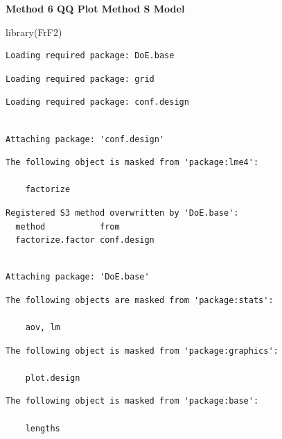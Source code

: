 \documentclass[
  letterpaper,
  DIV=11,
  numbers=noendperiod]{scrartcl}
\newenvironment{Shaded}{\begin{snugshade}}{\end{snugshade}}
\newcommand{\FunctionTok}[1]{\textcolor[rgb]{0.28,0.35,0.67}{#1}}
\newcommand{\NormalTok}[1]{\textcolor[rgb]{0.00,0.23,0.31}{#1}}
\begin{document}
\textbf{Method 6 QQ Plot Method S Model}

\begin{Shaded}
\begin{Highlighting}[]
\FunctionTok{library}\NormalTok{(FrF2)}
\end{Highlighting}
\end{Shaded}

\begin{verbatim}
Loading required package: DoE.base
\end{verbatim}

\begin{verbatim}
Loading required package: grid
\end{verbatim}

\begin{verbatim}
Loading required package: conf.design
\end{verbatim}

\begin{verbatim}

Attaching package: 'conf.design'
\end{verbatim}

\begin{verbatim}
The following object is masked from 'package:lme4':

    factorize
\end{verbatim}

\begin{verbatim}
Registered S3 method overwritten by 'DoE.base':
  method           from       
  factorize.factor conf.design
\end{verbatim}

\begin{verbatim}

Attaching package: 'DoE.base'
\end{verbatim}

\begin{verbatim}
The following objects are masked from 'package:stats':

    aov, lm
\end{verbatim}

\begin{verbatim}
The following object is masked from 'package:graphics':

    plot.design
\end{verbatim}

\begin{verbatim}
The following object is masked from 'package:base':

    lengths
\end{verbatim}
\end{document}
